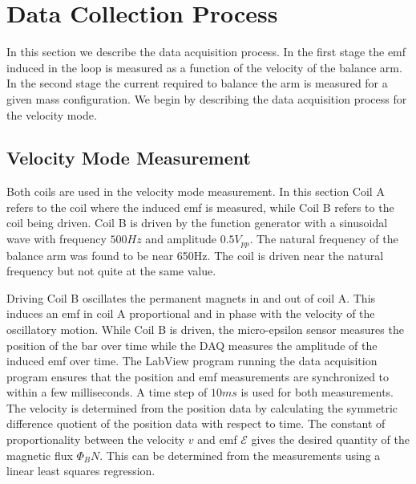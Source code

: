 \documentclass[aps,prstab,reprint,12pt]{revtex4-1}
\begin{document}

\section{Data Collection Process}


In this section we describe the data acquisition process. In the first stage the emf induced in the loop is measured as a function of the velocity of the balance arm. In the second stage the current required to balance the arm is measured for a given mass configuration. We begin by describing the data acquisition process for the velocity mode.

\subsection{Velocity Mode Measurement}

Both coils are used in the velocity mode measurement. In this section Coil A refers to the coil where the induced emf is measured, while Coil B refers to the coil being driven. Coil B is driven by the function generator with a sinusoidal wave with frequency $500\si{Hz}$ and amplitude $0.5V_{pp}$. The natural frequency of the balance arm was found to be near 650Hz. The coil is driven near the natural frequency but not quite at the same value.

Driving Coil B oscillates the permanent magnets in and out of coil A. This induces an emf in coil A proportional and in phase with the velocity of the oscillatory motion. While Coil B is driven, the micro-epsilon sensor measures the position of the bar over time while the DAQ measures the amplitude of the induced emf over time. The LabView program running the data acquisition program ensures that the position and emf measurements are synchronized to within a few milliseconds. A time step of $10\si{ms}$ is used for both measurements. The velocity is determined from the position data by calculating the symmetric difference quotient of the position data with respect to time. The constant of proportionality between the velocity $v$ and emf $\mathscr{E}$ gives the desired quantity of the magnetic flux $\Phi_B N$. This can be determined from the measurements using a linear least squares regression.
\end{document}
